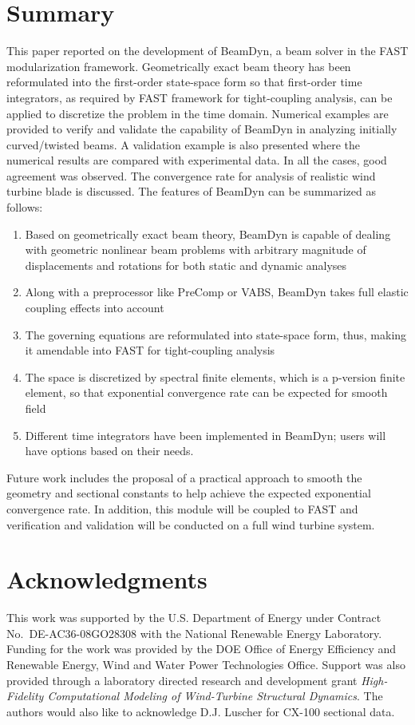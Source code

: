 \documentclass{aiaa-tc}
\begin{document}
 \section{Summary}
  This paper reported on the development of BeamDyn, a beam solver in the FAST modularization framework. Geometrically exact beam theory has been reformulated into the first-order state-space form so that first-order time integrators, as required by FAST framework for tight-coupling analysis, can be applied to discretize the problem in the time domain. Numerical examples are provided to verify and validate the capability of BeamDyn in analyzing initially curved/twisted beams. A validation example is also presented where the numerical results are compared with experimental data. In all the cases, good agreement was observed.  The convergence rate for analysis of realistic wind turbine blade is discussed. The features of BeamDyn can be summarized as follows:
  \begin{enumerate}
  \item Based on geometrically exact beam theory, BeamDyn is capable of dealing with geometric nonlinear beam problems with arbitrary magnitude of displacements and rotations for both static and dynamic analyses
  \item Along with a preprocessor like PreComp or VABS, BeamDyn takes full elastic coupling effects into account
  \item The governing equations are reformulated into state-space form, thus, making it amendable into FAST for tight-coupling analysis
  \item The space is discretized by spectral finite elements, which is a p-version finite element, so that exponential convergence rate can be expected for smooth field
  \item Different time integrators have been implemented in BeamDyn; users will have options based on their needs.
  \end{enumerate}
   Future work includes the proposal of a practical approach to smooth the geometry and sectional constants to help achieve the expected exponential convergence rate. In addition, this module will be coupled to FAST and verification and validation will be conducted on a full wind turbine system. 
  
\section*{Acknowledgments} 

This work was supported by the U.S. Department of Energy under Contract No.\
DE-AC36-08GO28308 with the National Renewable Energy Laboratory. Funding for the work was provided by the DOE Office of Energy Efficiency and Renewable Energy, Wind and Water Power Technologies Office. Support
was also provided through a laboratory directed research and development grant
\textit{High-Fidelity Computational Modeling of Wind-Turbine Structural
Dynamics}. The authors would also like to acknowledge D.J. Luscher for CX-100 sectional data.
  
  



\end{document}
